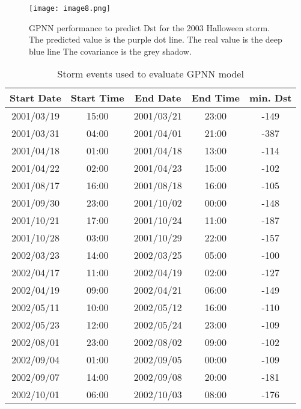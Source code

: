 

\begin{figure}
	\texttt{[image: image8.png]}
	\caption{GPNN performance to predict Dst for the 2003 Halloween storm. The predicted value is the purple dot line. The real value is the deep blue line The covariance is the grey shadow.}
    \label{fig:gpnnhalloween}
\end{figure}




\begin{table}[h]
	\fontsize{8}{9.6}\selectfont
	\centering
	\caption{Storm events used to evaluate GPNN model}
	\label{table:teststormsgpnn}
	\begin{tabular}{ccccc}
	\hline
	Start Date & Start Time & End Date & End Time & min. Dst \\ \hline
	2001/03/19 & 15:00 & 2001/03/21 & 23:00 & -149 \\
	2001/03/31 & 04:00 & 2001/04/01 & 21:00 & -387 \\
	2001/04/18 & 01:00 & 2001/04/18 & 13:00 & -114 \\
	2001/04/22 & 02:00 & 2001/04/23 & 15:00 & -102 \\
	2001/08/17 & 16:00 & 2001/08/18 & 16:00 & -105 \\
	2001/09/30 & 23:00 & 2001/10/02 & 00:00 & -148 \\
	2001/10/21 & 17:00 & 2001/10/24 & 11:00 & -187 \\
	2001/10/28 & 03:00 & 2001/10/29 & 22:00 & -157 \\
	2002/03/23 & 14:00 & 2002/03/25 & 05:00 & -100 \\
	2002/04/17 & 11:00 & 2002/04/19 & 02:00 & -127 \\
	2002/04/19 & 09:00 & 2002/04/21 & 06:00 & -149 \\
	2002/05/11 & 10:00 & 2002/05/12 & 16:00 & -110 \\
	2002/05/23 & 12:00 & 2002/05/24 & 23:00 & -109 \\
	2002/08/01 & 23:00 & 2002/08/02 & 09:00 & -102 \\
	2002/09/04 & 01:00 & 2002/09/05 & 00:00 & -109 \\
	2002/09/07 & 14:00 & 2002/09/08 & 20:00 & -181 \\
	2002/10/01 & 06:00 & 2002/10/03 & 08:00 & -176 \\

\end{tabular}
\end{table}
